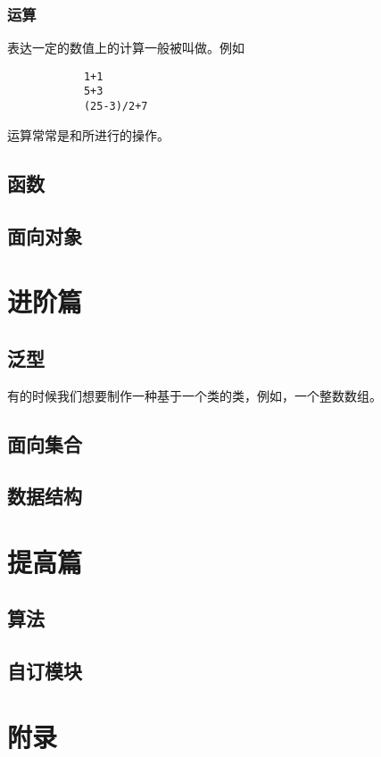 \documentclass{tufte-book}
\renewcommand{\thepart}{第\CJKnumber{\arabic{part}}部分}
\begin{document}
		\section{运算}
			表达一定的数值上的计算一般被叫做。例如
			\begin{verbatim}
			1+1
			5+3
			(25-3)/2+7
			\end{verbatim}
			运算常常是和所进行的操作。
			
	\chapter{函数}
	\chapter{面向对象}
	
\part{进阶篇}
	\chapter{泛型}
		有的时候我们想要制作一种基于一个类的类，例如，一个整数数组。
		
	\chapter{面向集合}
	\chapter{数据结构}
	
\part{提高篇}
	\chapter{算法}
	\chapter{自订模块}
	
\renewcommand{\thepart}{}

\part{附录}
	\printindex
	
\newpage
\end{document}
